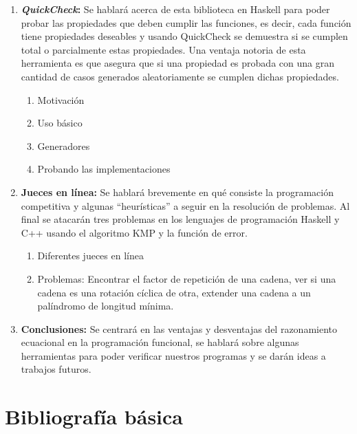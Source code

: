\documentclass[letterpaper,11pt]{article}
\begin{document}
\begin{enumerate}
\item \textbf{\textit{QuickCheck}:} Se hablará acerca de esta biblioteca en Haskell para poder
probar las propiedades que deben cumplir las funciones, es decir, cada función tiene
propiedades deseables y usando QuickCheck se demuestra si se cumplen total o parcialmente
estas propiedades. Una ventaja notoria de esta herramienta es que asegura que si una propiedad 
es probada con una gran cantidad de casos generados aleatoriamente se cumplen dichas propiedades.
\begin{enumerate}
    \item Motivación
    \item Uso básico
    \item Generadores
    \item Probando las implementaciones
\end{enumerate}

\item \textbf{Jueces en línea:} Se hablará brevemente en qué consiste la programación competitiva
y algunas ``heurísticas'' a seguir en la resolución de problemas. Al final se atacarán tres
problemas en los lenguajes de programación Haskell y C++ usando el algoritmo KMP y la función
de error.
\begin{enumerate}
    \item Diferentes jueces en línea
    \item Problemas: Encontrar el factor de repetición de una cadena, ver si una cadena es una
    rotación cíclica de otra, extender una cadena a un palíndromo de longitud mínima.
\end{enumerate}

\item \textbf{Conclusiones:} Se centrará en las ventajas y desventajas del razonamiento
ecuacional en la programación funcional, se hablará sobre algunas herramientas para poder
verificar nuestros programas y se darán ideas a trabajos futuros.


\end{enumerate}

\section{Bibliografía básica}
\end{document}
